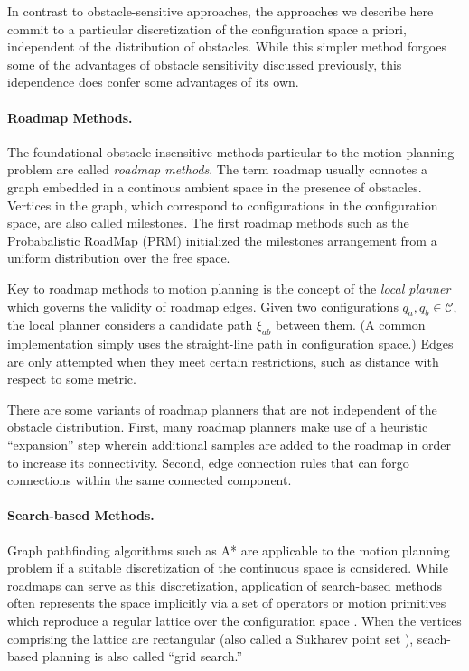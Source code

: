 In contrast to obstacle-sensitive approaches,
the approaches we describe here
commit to a particular discretization
of the configuration space a priori,
independent of the distribution of obstacles.
While this simpler method forgoes some of the advantages of
obstacle sensitivity discussed previously,
this idependence does confer some advantages of its own.

\paragraph{Roadmap Methods.}

The foundational obstacle-insensitive methods particular to the motion
planning problem are called \emph{roadmap methods}.
The term roadmap usually connotes a graph embedded in a continous
ambient space in the presence of obstacles.
Vertices in the graph,
which correspond to configurations in the configuration space,
are also called milestones.
The first roadmap methods such as the
Probabalistic RoadMap (PRM) \citep{kavrakietal1996prm}
initialized the milestones arrangement
from a uniform distribution over the free space.

Key to roadmap methods to motion planning
is the concept of the \emph{local planner}
which governs the validity of roadmap edges.
Given two configurations $q_a, q_b \in \mathcal{C}$,
the local planner considers a candidate path $\xi_{ab}$ between
them.
(A common implementation simply uses the straight-line path
in configuration space.)
Edges are only attempted when they meet certain restrictions,
such as distance with respect to some metric.

There are some variants of roadmap planners that are not independent
of the obstacle distribution.
First,
many roadmap planners make use of a heuristic ``expansion'' step
wherein additional samples are added to the roadmap
in order to increase its connectivity.
Second,
edge connection rules that can forgo connections within
the same connected component.


\paragraph{Search-based Methods.}
Graph pathfinding algorithms such as A* \citep{hart1968astar}
are applicable to the motion planning problem if a suitable
discretization of the continuous space is considered.
While roadmaps can serve as this discretization,
application of search-based methods often represents the space
implicitly via a set of operators or motion primitives
which reproduce a regular lattice over the configuration space
\citep{pivtoraiko2005statelattice}.
When the vertices comprising the lattice are rectangular
(also called a Sukharev point set \citep{sukharev1971extremum}),
seach-based planning is also called ``grid search.''

